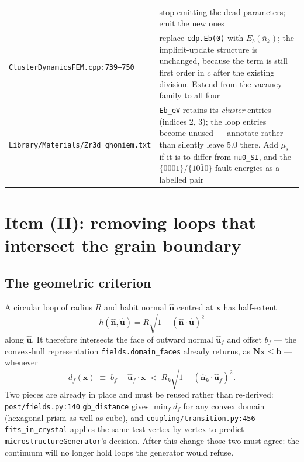 \documentclass[11pt]{article}
\newcommand{\fbk}{\discretionary{}{}{}}   %
\newcommand{\file}[1]{\texttt{\small #1}}
\begin{document}
{\begin{longtable}{@{}p{}p{}@{}}
  & stop emitting the dead parameters; emit the new ones\\
\addlinespace
\file{ClusterDynamicsFEM.\fbk cpp:739--750}
  & replace \verb|cdp.Eb(0)| with $E_b(\bar n_k)$; the implicit-update
    structure is unchanged, because the term is still first order in $c$ after
    the existing division.  Extend from the vacancy family to all four\\
\addlinespace
\file{Library/\fbk Materials/\fbk Zr3d\_\fbk ghoniem.\fbk txt}
  & \verb|Eb_eV| retains its \emph{cluster} entries (indices 2, 3); the loop
    entries become unused --- annotate rather than silently leave $5.0$ there.
    Add $\mu_s$ if it is to differ from \verb|mu0_SI|, and the
    $\{0001\}$/$\{10\bar10\}$ fault energies as a labelled pair\\
\bottomrule
\end{longtable}
}

\section{Item (II): removing loops that intersect the grain boundary}

\subsection{The geometric criterion}

A circular loop of radius $R$ and habit normal $\hat{\mathbf n}$ centred at
$\mathbf x$ has half-extent
\begin{equation*}
h(\hat{\mathbf n},\hat{\mathbf u})
 =R\sqrt{1-(\hat{\mathbf n}\cdot\hat{\mathbf u})^{2}}
\end{equation*}
along $\hat{\mathbf u}$.  It therefore intersects the face of outward normal
$\hat{\mathbf u}_f$ and offset $b_f$ --- the convex-hull representation
\verb|fields.domain_faces| already returns, as
$\mathbf N\mathbf x\le\mathbf b$ --- whenever
\begin{equation}
d_f(\mathbf x)\;\equiv\; b_f-\hat{\mathbf u}_f\!\cdot\!\mathbf x
 \;<\; R_k\sqrt{1-(\hat{\mathbf n}_k\cdot\hat{\mathbf u}_f)^{2}} .
\label{eq:intersect}
\end{equation}
Two pieces are already in place and must be reused rather than re-derived:
\file{post/\fbk fields.\fbk py:140} \verb|gb_distance| gives $\min_f d_f$ for
any convex domain (hexagonal prism as well as cube), and
\file{coupling/\fbk transition.\fbk py:456} \verb|fits_in_crystal| applies the
same test vertex by vertex to predict \verb|microstructureGenerator|'s
decision.  After this change those two must agree: the continuum will no
longer hold loops the generator would refuse.
\end{document}
